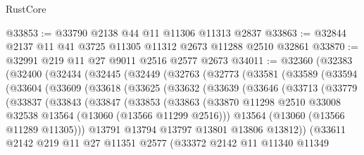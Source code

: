 \begin{lexlean}{RustCore}
\begin{coremodule}
@33853 := @33790 @2138 @44 @11 @11306 @11313 @2837
@33863 := @32844 @2137 @11 @41 @3725 @11305 @11312 @2673 @11288 @2510 @32861
@33870 := @32991 @219 @11 @27 @9011 @2516 @2577 @2673
@34011 := @32360
    (@32383
      (@32400
        (@32434
          (@32445
            (@32449
              (@32763
                (@32773
                  (@33581
                    (@33589
                      (@33594
                        (@33604
                          (@33609
                            (@33618
                              (@33625
                                (@33632
                                  (@33639
                                    (@33646
                                      (@33713
                                        (@33779
                                          (@33837
                                            (@33843
                                              (@33847
                                                (@33853
                                                  (@33863
                                                    (@33870
                                                      @11298
                                                      @2510
                                                      @33008
                                                      @32538
                                                      @13564
                                                      (@13060 (@13566 @11299 @2516)))
                                                    @13564
                                                    (@13060 (@13566 @11289 @11305)))
                                                  @13791
                                                  @13794
                                                  @13797
                                                  @13801
                                                  @13806
                                                  @13812))
                                              (@33611
                                                @2142
                                                @219
                                                @11
                                                @27
                                                @11351
                                                @2577
                                                (@33372
                                                  @2142
                                                  @11
                                                  @11340
                                                  @11349

\end{coremodule}
\end{lexlean}

